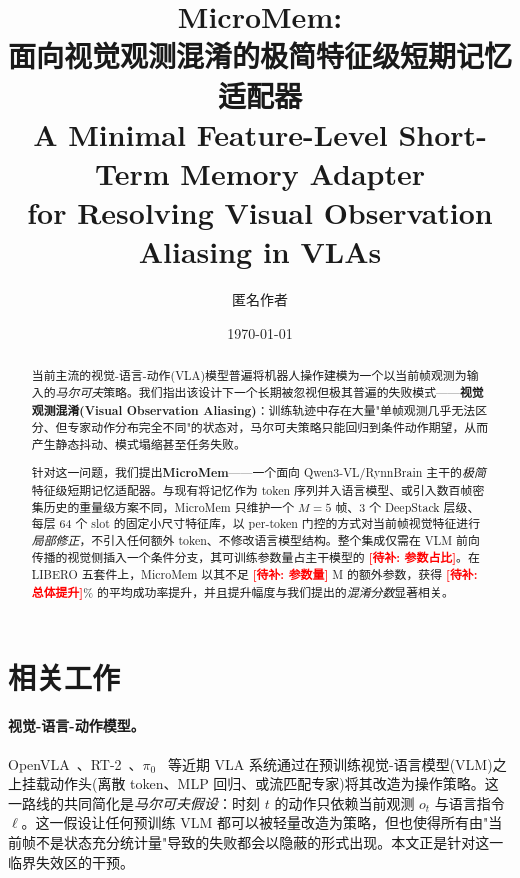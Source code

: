 \documentclass[11pt]{ctexart}
\title{MicroMem:\\
面向视觉观测混淆的极简特征级短期记忆适配器\\
\large A Minimal Feature-Level Short-Term Memory Adapter\\for Resolving Visual Observation Aliasing in VLAs}
\author[1]{匿名作者}
\affil[1]{匿名机构}
\date{\today}
\newcommand{\todo}[1]{\textcolor{red}{\textbf{[待补: #1]}}}
\begin{document}
\maketitle

\begin{abstract}
当前主流的视觉-语言-动作(VLA)模型普遍将机器人操作建模为一个以当前帧观测为输入的\emph{马尔可夫}策略。我们指出该设计下一个长期被忽视但极其普遍的失败模式——\textbf{视觉观测混淆(Visual Observation Aliasing)}：训练轨迹中存在大量"单帧观测几乎无法区分、但专家动作分布完全不同"的状态对，马尔可夫策略只能回归到条件动作期望，从而产生静态抖动、模式塌缩甚至任务失败。

针对这一问题，我们提出\textbf{MicroMem}——一个面向 Qwen3-VL/RynnBrain 主干的\emph{极简}特征级短期记忆适配器。与现有将记忆作为 token 序列并入语言模型、或引入数百帧密集历史的重量级方案不同，MicroMem 只维护一个 $M{=}5$ 帧、$3$ 个 DeepStack 层级、每层 $64$ 个 slot 的固定小尺寸特征库，以 per-token 门控的方式对当前帧视觉特征进行\emph{局部修正}，不引入任何额外 token、不修改语言模型结构。整个集成仅需在 VLM 前向传播的视觉侧插入一个条件分支，其可训练参数量占主干模型的 \todo{参数占比}。在 LIBERO 五套件上，MicroMem 以其不足 \todo{参数量} M 的额外参数，获得 \todo{总体提升}\% 的平均成功率提升，并且提升幅度与我们提出的\emph{混淆分数}显著相关。
\end{abstract}

\section{相关工作}
\label{sec:related}

\paragraph{视觉-语言-动作模型。}
OpenVLA~\cite{kim2024openvla}、RT-2~\cite{brohan2023rt2}、$\pi_0$~\cite{black2024pi0} 等近期 VLA 系统通过在预训练视觉-语言模型(VLM)之上挂载动作头(离散 token、MLP 回归、或流匹配专家)将其改造为操作策略。这一路线的共同简化是\emph{马尔可夫假设}：时刻 $t$ 的动作只依赖当前观测 $o_t$ 与语言指令 $\ell$。这一假设让任何预训练 VLM 都可以被轻量改造为策略，但也使得所有由"当前帧不是状态充分统计量"导致的失败都会以隐蔽的形式出现。本文正是针对这一临界失效区的干预。
\end{document}
